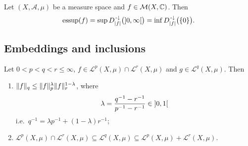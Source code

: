 \begin{lemma}
Let $(X, \mathcal{A}, \mu)$ be a measure space and $f\in \operatorname{\mathcal{M}}(X, \mathbb{C})$. Then
\[ \essup(f) = \sup D_{|f|}^{\preimf}\big(\interval[o]{0,\infty}\big) = \inf D_{|f|}^{\preimf}\big(\{0\}\big). \]
\end{lemma}

\subsection{Embeddings and inclusions}

\begin{proposition}
Let $0<p<q<r \leq \infty$, $f\in \mathcal{L}^p(X,\mu) \cap \mathcal{L}^r(X,\mu)$ and $g\in \mathcal{L}^q(X,\mu)$. Then
\begin{enumerate}
\item $\lVert f\rVert_q \leq \lVert f\rVert_p^{\lambda}\lVert f\rVert_r^{1-\lambda}$, where
\[ \lambda = \frac{q^{-1} - r^{-1}}{p^{-1} - r^{-1}} \in \interval[o]{0,1} \]
i.e.\ $q^{-1} = \lambda p^{-1} + (1-\lambda)r^{-1}$;
\item $\mathcal{L}^p(X,\mu)\cap \mathcal{L}^r(X,\mu) \subseteq \mathcal{L}^q(X,\mu) \subseteq \mathcal{L}^p(X,\mu) + \mathcal{L}^r(X,\mu)$.
\end{enumerate}
\end{proposition}
